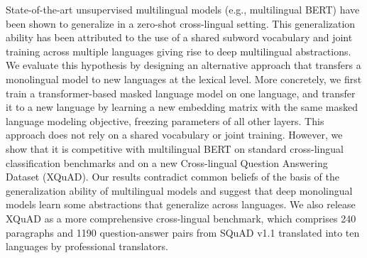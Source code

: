 State-of-the-art unsupervised multilingual models (e.g., multilingual BERT) have been shown to generalize in a zero-shot cross-lingual setting. This generalization ability has been attributed to the use of a shared subword vocabulary and joint training across multiple languages giving rise to deep multilingual abstractions. We evaluate this hypothesis by designing an alternative approach that transfers a monolingual model to new languages at the lexical level. More concretely, we first train a transformer-based masked language model on one language, and transfer it to a new language by learning a new embedding matrix with the same masked language modeling objective, freezing parameters of all other layers. This approach does not rely on a shared vocabulary or joint training. However, we show that it is competitive with multilingual BERT on standard cross-lingual classification benchmarks and on a new Cross-lingual Question Answering Dataset (XQuAD). Our results contradict common beliefs of the basis of the generalization ability of multilingual models and suggest that deep monolingual models learn some abstractions that generalize across languages. We also release XQuAD as a more comprehensive cross-lingual benchmark, which comprises 240 paragraphs and 1190 question-answer pairs from SQuAD v1.1 translated into ten languages by professional translators.
